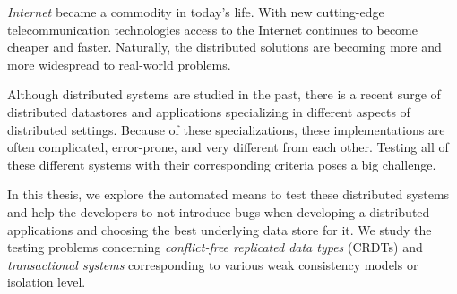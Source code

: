 


\emph{Internet} became a commodity in today's life. With new cutting-edge telecommunication technologies access to the Internet continues to become cheaper and faster. Naturally, the distributed solutions are becoming more and more widespread to real-world problems. 

Although distributed systems are studied in the past, there is a recent surge of distributed datastores and applications specializing in different aspects of distributed settings. Because of these specializations, these implementations are often complicated, error-prone, and very different from each other. Testing all of these different systems with their corresponding criteria poses a big challenge.

In this thesis, we explore the automated means to test these distributed systems and help the developers to not introduce bugs when developing a distributed applications and choosing the best underlying data store for it. We study the testing problems concerning \emph{conflict-free replicated data types} (CRDTs) and \emph{transactional systems} corresponding to various weak consistency models or isolation level.

